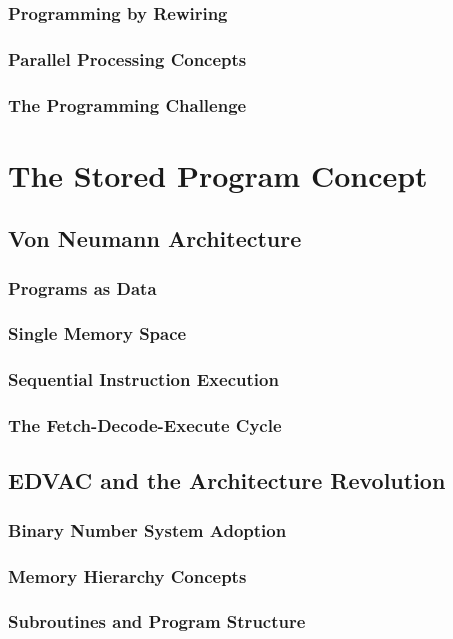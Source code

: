 \documentclass[12pt, oneside, openany]{book}
\begin{document}
\subsubsection{Programming by Rewiring}
\subsubsection{Parallel Processing Concepts}
\subsubsection{The Programming Challenge}

\section{The Stored Program Concept}
\subsection{Von Neumann Architecture}
\subsubsection{Programs as Data}
\subsubsection{Single Memory Space}
\subsubsection{Sequential Instruction Execution}
\subsubsection{The Fetch-Decode-Execute Cycle}

\subsection{EDVAC and the Architecture Revolution}
\subsubsection{Binary Number System Adoption}
\subsubsection{Memory Hierarchy Concepts}
\subsubsection{Subroutines and Program Structure}
\end{document}
